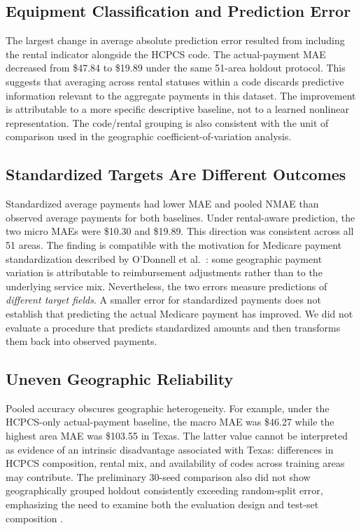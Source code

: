 \subsection{Equipment Classification and Prediction Error}
The largest change in average absolute prediction error resulted from including the rental indicator alongside the HCPCS code. The actual-payment MAE decreased from \$47.84 to \$19.89 under the same 51-area holdout protocol. This suggests that averaging across rental statuses within a code discards predictive information relevant to the aggregate payments in this dataset. The improvement is attributable to a more specific descriptive baseline, not to a learned nonlinear representation. The code/rental grouping is also consistent with the unit of comparison used in the geographic coefficient-of-variation analysis.

\subsection{Standardized Targets Are Different Outcomes}
Standardized average payments had lower MAE and pooled NMAE than observed average payments for both baselines. Under rental-aware prediction, the two micro MAEs were \$10.30 and \$19.89. This direction was consistent across all 51 areas. The finding is compatible with the motivation for Medicare payment standardization described by O'Donnell et al.~\citep{odonnell2013}: some geographic payment variation is attributable to reimbursement adjustments rather than to the underlying service mix. Nevertheless, the two errors measure predictions of \emph{different target fields}. A smaller error for standardized payments does not establish that predicting the actual Medicare payment has improved. We did not evaluate a procedure that predicts standardized amounts and then transforms them back into observed payments.

\subsection{Uneven Geographic Reliability}
Pooled accuracy obscures geographic heterogeneity. For example, under the HCPCS-only actual-payment baseline, the macro MAE was \$46.27 while the highest area MAE was \$103.55 in Texas. The latter value cannot be interpreted as evidence of an intrinsic disadvantage associated with Texas: differences in HCPCS composition, rental mix, and availability of codes across training areas may contribute. The preliminary 30-seed comparison also did not show geographically grouped holdout consistently exceeding random-split error, emphasizing the need to examine both the evaluation design and test-set composition \citep{roberts2017}.

